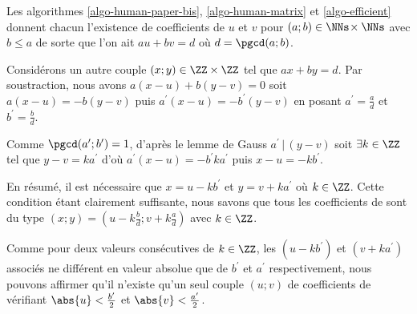 Les algorithmes \ref{algo-human-paper-bis}, \ref{algo-human-matrix} et \ref{algo-efficient} donnent chacun l'existence de coefficients de \bb{} $u$ et $v$ pour $(a ; b) \in \NNs \!\times \NNs$ avec $b \leq a$ de sorte que l'on ait $a u + b v = d$ où $d = \pgcd(a ; b)$.


\medskip


Considérons un autre couple $(x ; y) \in \ZZ \times \ZZ$ tel que $a x + b y = d$. Par soustraction, nous avons $a(x - u) + b(y - v) = 0$ soit $a(x - u) = - b(y - v)$ puis $a^\prime(x - u) = - b^\prime(y - v)$ en posant $a^\prime = \frac{a}{d}$ et  $b^\prime = \frac{b}{d}$.


\medskip


Comme $\pgcd(a^\prime ; b^\prime) = 1$, d'après le lemme de Gauss $a^\prime \,|\, (y - v)$ soit $\exists k \in \ZZ$ tel que $y - v = k a^\prime$ d'où $a^\prime(x - u) = - b^\prime k a^\prime$ puis $x - u = - k b^\prime$. 


\medskip


En résumé, il est nécessaire que $x = u - k b^\prime$ et $y = v + k a^\prime$ où $k \in \ZZ$. Cette condition étant clairement suffisante, nous savons que tous les coefficients de \bb{} sont du type $(x ; y) = (u - k \frac{b}{d} ; v + k \frac{a}{d})$ avec $k \in \ZZ$.


\begin{remark}
	Comme pour deux valeurs consécutives de $k \in \ZZ$, les $(u - k b^\prime)$ et $(v + k a^\prime)$ associés ne différent en valeur absolue que de $b^\prime$ et $a^\prime$ respectivement, nous pouvons affirmer qu'il n'existe qu'un seul couple $(u ; v)$ de coefficients de \bb{} vérifiant $\abs{u} < \frac{b^\prime}{2}$ et $\abs{v} < \frac{a^\prime}{2}$.
\end{remark}
